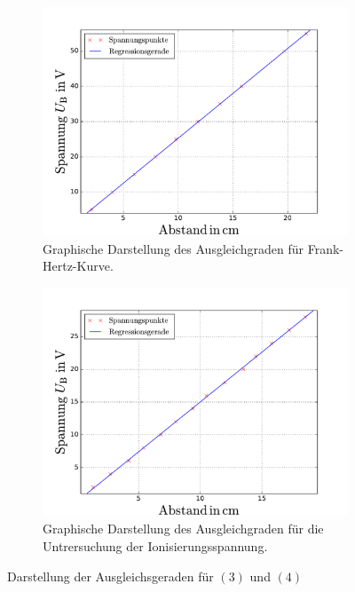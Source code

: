 \begin{figure}
  \centering
  \begin{subfigure}{0.48\textwidth}
    \centering
    \includegraphics[width=1 \textwidth]{../Messdaten/frank_hertz_kuvre.pdf}
    \caption{Graphische Darstellung des Ausgleichgraden für Frank-Hertz-Kurve.}
    \label{fig: frank_hertz}
  \end{subfigure}
  \begin{subfigure}{0.48\textwidth}
    \centering
    \includegraphics[width=1 \textwidth]{../Messdaten/ioni.pdf}
    \caption{Graphische Darstellung des Ausgleichgraden für die Untrersuchung der Ionisierungsspannung.}
    \label{fig: enrgie_hot}
  \end{subfigure}
  \caption{Darstellung der Ausgleichsgeraden für $(3)$ und $(4)$}
  \label{fig: darstellung_2}
\end{figure}
